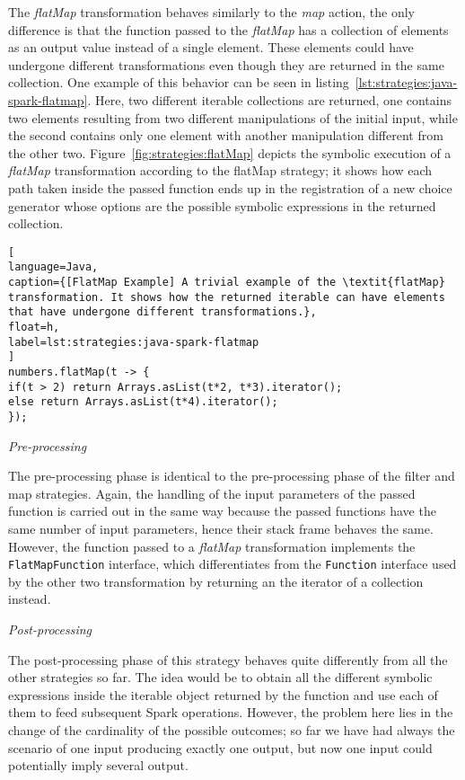

The \textit{flatMap} transformation behaves similarly to the \textit{map} action, the only difference is that the function passed to the \textit{flatMap} has a collection of elements as an output value instead of a single element. These elements could have undergone different transformations even though they are returned in the same collection. One example of this behavior can be seen in listing~\ref{lst:strategies:java-spark-flatmap}. Here, two different iterable collections are returned, one contains two elements resulting from two different manipulations of the initial input, while the second contains only one element with another manipulation different from the other two. Figure~\ref{fig:strategies:flatMap} depicts the symbolic execution of a \textit{flatMap} transformation according to the flatMap strategy; it shows how each path taken inside the passed function ends up in the registration of a new choice generator whose options are the possible symbolic expressions in the returned collection.

\begin{lstlisting}[
language=Java,
caption={[FlatMap Example] A trivial example of the \textit{flatMap} transformation. It shows how the returned iterable can have elements that have undergone different transformations.},
float=h,
label=lst:strategies:java-spark-flatmap
]
numbers.flatMap(t -> {				
if(t > 2) return Arrays.asList(t*2, t*3).iterator();
else return Arrays.asList(t*4).iterator();				
});
\end{lstlisting}

\textit{Pre-processing}

The pre-processing phase is identical to the pre-processing phase of the filter and map strategies. Again, the handling of the input parameters of the passed function is carried out in the same way because the passed functions have the same number of input parameters, hence their stack frame behaves the same. However, the function passed to a \textit{flatMap} transformation implements the \texttt{FlatMapFunction} interface, which differentiates from the \texttt{Function} interface used by the other two transformation by returning an the iterator of a collection instead.

\textit{Post-processing}

The post-processing phase of this strategy behaves quite differently from all the other strategies so far. The idea would be to obtain all the different symbolic expressions inside the iterable object returned by the function and use each of them to feed subsequent Spark operations. However, the problem here lies in the change of the cardinality of the possible outcomes; so far we have had always the scenario of one input producing exactly one output, but now one input could potentially imply several output.

